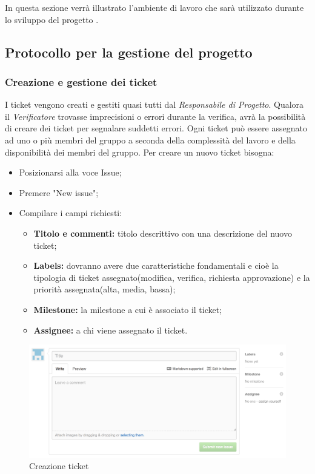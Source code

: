 In questa sezione verrà illustrato l'ambiente di lavoro che sarà utilizzato durante lo sviluppo del progetto \PROGETTO.\\

\subsection{Protocollo per la gestione del progetto}

\subsubsection{Creazione e gestione dei ticket}

I \gls{ticket} vengono creati e gestiti quasi tutti dal \textit{Responsabile di Progetto}.
Qualora il \textit{Verificatore} trovasse imprecisioni o errori durante la verifica, avrà la possibilità di creare dei \gls{ticket} per segnalare suddetti errori.
Ogni \gls{ticket} può essere assegnato ad uno o più membri del gruppo a seconda della complessità del lavoro e della disponibilità dei membri del gruppo.
Per creare un nuovo \gls{ticket} bisogna:

\begin{itemize}
	\item Posizionarsi alla voce Issue;
	\item Premere "New issue";
	\item Compilare i campi richiesti:
	\begin{itemize}
		\item \textbf{Titolo e commenti:} titolo descrittivo con una descrizione del nuovo \gls{ticket};
		\item \textbf{Labels:} dovranno avere due caratteristiche fondamentali e cioè la tipologia di \gls{ticket} assegnato(modifica, verifica, richiesta approvazione) e la priorità assegnata(alta, media, bassa);
		\item \textbf{\gls{Milestone}:} la \gls{milestone} a cui è associato il \gls{ticket};
		\item \textbf{Assignee:} a chi viene assegnato il \gls{ticket}.
	\end{itemize}
\end{itemize}
\begin{figure}[h]
	\centering
	\includegraphics[width=0.7\linewidth]{img/ticket}
	\caption[Creazione ticket]{Creazione ticket}
	\label{fig:ticket}
\end{figure}

